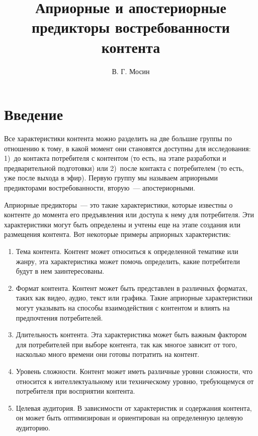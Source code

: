 \documentclass[a4paper,12pt]{article}
\title{Априорные и апостериорные предикторы востребованности контента}
\author{В. Г. Мосин}
\date{}
\begin{document}
	\maketitle
	
\tableofcontents
	
\section{Введение}
Все характеристики контента можно разделить на две большие группы по отношению к тому, в какой момент они становятся доступны для исследования: 1)~до контакта потребителя с контентом (то есть, на этапе разработки и предварительной подготовки)  или 2)~после контакта с потребителем (то есть, уже после выхода в эфир). Первую группу мы называем априорными предикторами востребованности, вторую~--- апостериорными.

Априорные предикторы~--- это такие характеристики, которые известны о контенте до момента его предъявления или доступа к нему для потребителя. Эти характеристики могут быть определены и учтены еще на этапе создания или размещения контента. 
Вот некоторые примеры априорных характеристик:

\medskip
\begin{enumerate}
	\item Тема контента. Контент может относиться к определенной тематике или жанру, эта характеристика может помочь определить, какие потребители будут в нем заинтересованы.
	\item Формат контента. Контент может быть представлен в различных форматах, таких как видео, аудио, текст или графика. Такие априорные характеристики могут указывать на способы взаимодействия с контентом и влиять на предпочтения потребителей.
	\item Длительность контента. Эта характеристика может быть важным фактором для потребителей при выборе контента, так как многое зависит от того, насколько много времени они готовы потратить на контент.
	\item Уровень сложности. Контент может иметь различные уровни сложности, что относится к интеллектуальному или техническому уровню, требующемуся от потребителя при восприятии контента. 
	\item Целевая аудитория. В зависимости от характеристик и содержания контента, он может быть оптимизирован и ориентирован на определенную целевую аудиторию.
\end{enumerate}
\end{document}
